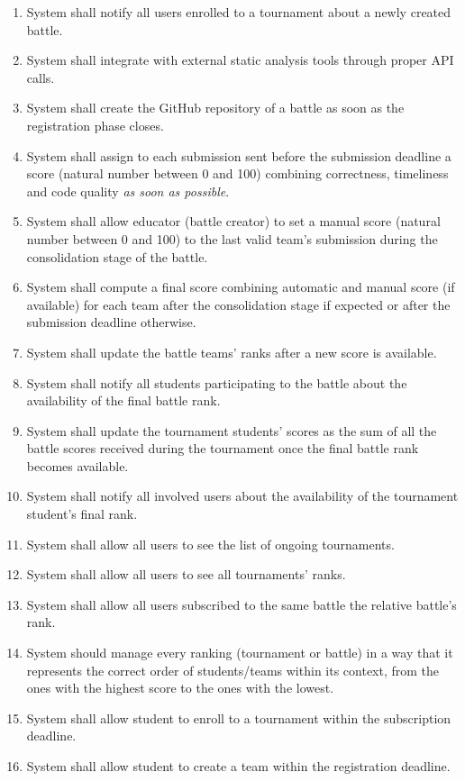 \begin{enumerate}[label=$\bullet$ \textbf{R\arabic*:}]
    \item System shall notify all users enrolled to a tournament about a newly created battle.
    \item System shall integrate with external static analysis tools through proper API calls.
    \item System shall create the GitHub repository of a battle as soon as the registration phase closes.
    \item System shall assign to each submission sent before the submission deadline a score (natural number between 0 and 100) combining correctness, timeliness and code quality \textit{as soon as possible}.
    \item System shall allow educator (battle creator) to set a manual score (natural number between 0 and 100) to the last valid team’s submission during the consolidation stage of the battle.
    \item System shall compute a final score combining automatic and manual score (if available) for each team after the consolidation stage if expected or after the submission deadline otherwise.
    \item System shall update the battle teams’ ranks after a new score is available.
    \item System shall notify all students participating to the battle about the availability of the final battle rank.
    \item System shall update the tournament students’ scores as the sum of all the battle scores received during the tournament once the final battle rank becomes available.
    \item System shall notify all involved users about the availability of the tournament student’s final rank.
    \item System shall allow all users to see the list of ongoing tournaments.
    \item System shall allow all users to see all tournaments’ ranks.
    \item System shall allow all users subscribed to the same battle the relative battle's rank.
    \item System should manage every ranking (tournament or battle) in a way that it represents the correct order of students/teams within its context, from the ones with the highest score to the ones with the lowest.
    \item System shall allow student to enroll to a tournament within the subscription deadline.
    \item System shall allow student to create a team within the registration deadline.

\end{enumerate}
